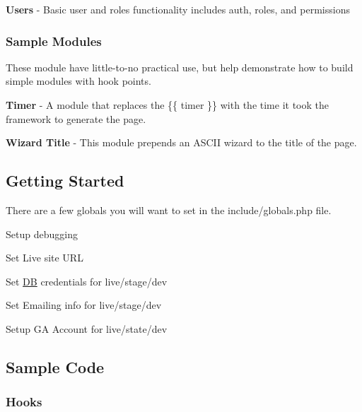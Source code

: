 \begin{DoxyItemize}
\item {\bfseries Users} -\/ Basic user and roles functionality includes auth, roles, and permissions
\end{DoxyItemize}

\subsubsection*{Sample Modules}

These module have little-\/to-\/no practical use, but help demonstrate how to build simple modules with hook points.


\begin{DoxyItemize}
\item {\bfseries Timer} -\/ A module that replaces the \{\{ timer \}\} with the time it took the framework to generate the page.
\item {\bfseries Wizard Title} -\/ This module prepends an A\-S\-C\-I\-I wizard to the title of the page.
\end{DoxyItemize}

\subsection*{Getting Started}

There are a few globals you will want to set in the include/globals.\-php file.


\begin{DoxyItemize}
\item Setup debugging
\item Set Live site U\-R\-L
\item Set \hyperlink{class_d_b}{D\-B} credentials for live/stage/dev
\item Set Emailing info for live/stage/dev
\item Setup G\-A Account for live/state/dev
\end{DoxyItemize}

\subsection*{Sample Code}

\subsubsection*{Hooks}

